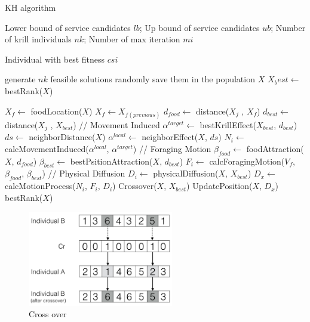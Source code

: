 \documentclass[10pt,journal,compsoc]{IEEEtran}
\begin{document}
\begin{algorithm}
\caption{KH algorithm}
\label{alg1}
\begin{algorithmic}[1]

\REQUIRE Lower bound of service candidates $lb$; Up bound of service candidates $ub$; Number of krill individuals $nk$; Number of max iteration $mi$

\ENSURE Individual with best fitness $csi$

\STATE generate $nk$ feasible solutions randomly
\STATE save them in the population $X$
\STATE $X_best \leftarrow$ bestRank($X$)

  \STATE $X_f \leftarrow$ foodLocation($X$)
    \STATE $X_f \leftarrow X_{f(previous)}$
  \ENDIF
    \STATE $d_{food} \leftarrow$ distance($X_j$ , $X_f$)
    \STATE $d_{best} \leftarrow$ distance($X_j$ , $X_{best}$)
    \STATE // Movement Induced
    \STATE $\alpha^{target} \leftarrow $ bestKrillEffect($X_{best}$, $d_{best}$)
    \STATE $ds \leftarrow $ neighborDistance($X$)
    \STATE $\alpha^{local} \leftarrow $ neighborEffect($X$, $ds$)
    \STATE $N_i \leftarrow$ calcMovementInduced($\alpha^{local}$, $\alpha^{target}$)
    \STATE // Foraging Motion
    \STATE $\beta_{food} \leftarrow$ foodAttraction($X$, $d_{food}$)
    \STATE $\beta_{best} \leftarrow$ bestPsitionAttraction($X$, $d_{best}$)
    \STATE $F_i \leftarrow$ calcForagingMotion($V_f$, $\beta_{food}$, $\beta_{best}$)
    \STATE // Physical Diffusion
    \STATE $D_i \leftarrow$ physicalDiffusion($X$, $X_{best}$)
    \STATE $D_x \leftarrow$ calcMotionProcess($N_i$, $F_i$, $D_i$)
    \STATE Crossover($X$, $X_{best}$)
    \STATE UpdatePosition($X$, $D_x$)
  \ENDFOR
\ENDFOR
\RETURN bestRank($X$)

\end{algorithmic}
\end{algorithm}

\begin{figure}[!t]
\centering
\includegraphics[width=2.5in]{./img/pic4.png}
\caption{Cross over}
\label{fig_opportunistic}
\end{figure}
\end{document}
